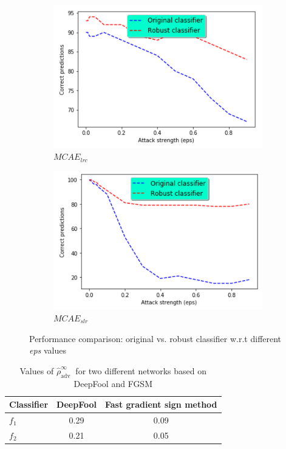 \begin{figure}[h]
	\centering
	\begin{subfigure}{.48\linewidth}
		\centering
		\includegraphics[scale=0.95]{images/adversarial_training_1.png}
		\caption{$MCAE_{lrc}$}
        \label{fig:normal_vs_robust_f1}
	\end{subfigure}
	\begin{subfigure}{0.48\linewidth}
		\centering
		\includegraphics[scale=0.95]{images/adversarial_training_2.png}
		\caption{$MCAE_{slr}$}
        \label{fig:normal_vs_robust_f2}
	\end{subfigure}
	\caption{Performance comparison: original vs.  robust classifier w.r.t  different \textit{eps} values} 
	\label{fig:normal_vs_robust_models}
\end{figure}

\begin{table}[h]
    \centering
    \caption{Values of $\hat{\rho}_{\text {adv }}^{\infty}$ for two different networks based on DeepFool and FGSM}
    \begin{tabular}{l|c|c}
        \hline \textbf{Classifier} & \textbf{DeepFool} & \textbf{Fast gradient sign method} \\ \hline $f_1$ & 0.29 & 0.09 \\ \hline 
        $f_2$ & 0.21 & 0.05 \\
        \hline
    \end{tabular}
    \label{tab:robustness_result}
\end{table}

